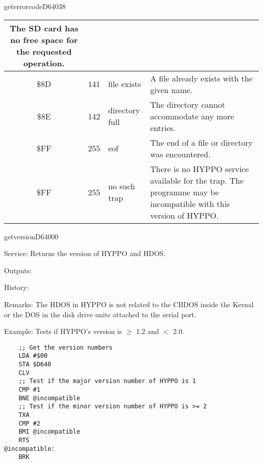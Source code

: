 \begin{hyppotrap}{geterrorcode}{D640}{38}
{\begin{longtable}{|c|r|l|p{8cm}|}
    The SD card has no free space for the requested operation.
    \\\hline
    \index{HYPPO Error Codes!\$8D}
    \$8D & 141 & file exists &
    A file already exists with the given name.
    \\\hline
    \index{HYPPO Error Codes!\$8E}
    \$8E & 142 & directory full &
    The directory cannot accommodate any more entries.
    \\\hline
    \index{HYPPO Error Codes!\$FF}
    \$FF & 255 & eof &
    The end of a file or directory was encountered.
    \\\hline
    \index{HYPPO Error Codes!\$FF}
    \$FF & 255 & no such trap &
    There is no HYPPO service available for the trap. The programme may be
    incompatible with this version of HYPPO.
    \\\hline
  \end{longtable}
}
\end{hyppotrap}


\newpage
\begin{hyppotrap}{getversion}{D640}{00}
\item [Service:]
  Returns the version of HYPPO and HDOS.
\item [Outputs:]
\item [History:]
\item [Remarks:]
  The HDOS in HYPPO is not related to the CBDOS inside the Kernal or the
  DOS in the disk drive units attached to the serial port.
\item [Example:]
  Tests if HYPPO's version is $\geq$ 1.2 and $<$ 2.0.
\begin{tcolorbox}[colback=black,coltext=white]
\verbatimfont{\codefont}
\begin{verbatim}
    ;; Get the version numbers
    LDA #$00
    STA $D640
    CLV
    ;; Test if the major version number of HYPPO is 1
    CMP #1
    BNE @incompatible
    ;; Test if the minor version number of HYPPO is >= 2
    TXA
    CMP #2
    BMI @incompatible
    RTS
@incompatible:
    BRK
\end{verbatim}
\end{tcolorbox}
\end{hyppotrap}


